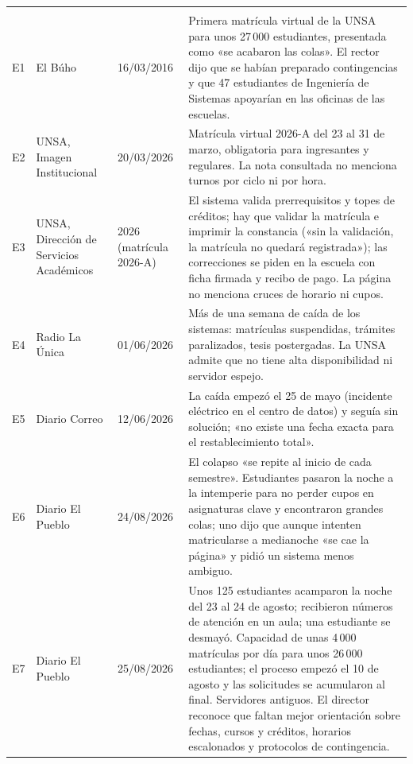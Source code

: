 \begin{longtable}{|p{0.8cm}|p{3.7cm}|p{2.2cm}|p{7.1cm}|}
	\hline
	\cab\hd{ID} & \hd{Fuente} & \hd{Fecha} & \hd{Hecho relevante para MatrLab}\\
	\hline\endfirsthead
	\hline
	\cab\hd{ID} & \hd{Fuente} & \hd{Fecha} & \hd{Hecho relevante para MatrLab}\\
	\hline\endhead
	E1 & El Búho \cite{elbuho2016} & 16/03/2016 & Primera matrícula virtual de la UNSA para unos 27\,000 estudiantes, presentada como «se acabaron las colas». El rector dijo que se habían preparado contingencias y que 47 estudiantes de Ingeniería de Sistemas apoyarían en las oficinas de las escuelas. \\\hline
	E2 & UNSA, Imagen Institucional \cite{unsa2026} & 20/03/2026 & Matrícula virtual 2026-A del 23 al 31 de marzo, obligatoria para ingresantes y regulares. La nota consultada no menciona turnos por ciclo ni por hora. \\\hline
	E3 & UNSA, Dirección de Servicios Académicos \cite{dsa} & 2026 (matrícula 2026-A) & El sistema valida prerrequisitos y topes de créditos; hay que validar la matrícula e imprimir la constancia («sin la validación, la matrícula no quedará registrada»); las correcciones se piden en la escuela con ficha firmada y recibo de pago. La página no menciona cruces de horario ni cupos. \\\hline
	E4 & Radio La Única \cite{radiounica} & 01/06/2026 & Más de una semana de caída de los sistemas: matrículas suspendidas, trámites paralizados, tesis postergadas. La UNSA admite que no tiene alta disponibilidad ni servidor espejo. \\\hline
	E5 & Diario Correo \cite{correo} & 12/06/2026 & La caída empezó el 25 de mayo (incidente eléctrico en el centro de datos) y seguía sin solución; «no existe una fecha exacta para el restablecimiento total». \\\hline
	E6 & Diario El Pueblo \cite{elpueblo24} & 24/08/2026 & El colapso «se repite al inicio de cada semestre». Estudiantes pasaron la noche a la intemperie para no perder cupos en asignaturas clave y encontraron grandes colas; uno dijo que aunque intenten matricularse a medianoche «se cae la página» y pidió un sistema menos ambiguo. \\\hline
	E7 & Diario El Pueblo \cite{elpueblo25} & 25/08/2026 & Unos 125 estudiantes acamparon la noche del 23 al 24 de agosto; recibieron números de atención en un aula; una estudiante se desmayó. Capacidad de unas 4\,000 matrículas por día para unos 26\,000 estudiantes; el proceso empezó el 10 de agosto y las solicitudes se acumularon al final. Servidores antiguos. El director reconoce que faltan mejor orientación sobre fechas, cursos y créditos, horarios escalonados y protocolos de contingencia. \\\hline

\end{longtable}
